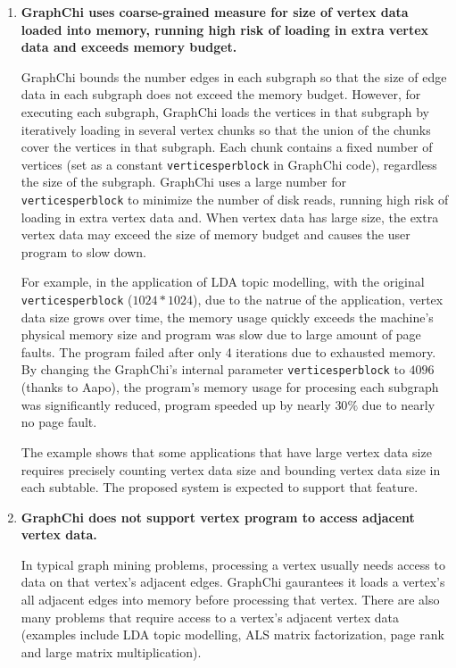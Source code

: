 \documentclass[10pt, twocolumn, a4paper]{article}
\begin{document}
\begin{enumerate}
  
\item \textbf{GraphChi uses coarse-grained measure for size of vertex data loaded into memory, running high risk of loading in extra vertex data and exceeds memory budget.}

GraphChi bounds the number edges in each subgraph so that the size of edge data in each subgraph does not exceed the memory budget. However, for executing each subgraph, GraphChi loads the vertices in that subgraph by iteratively loading in several vertex chunks so that the union of the chunks cover the vertices in that subgraph. Each chunk contains a fixed number of vertices (set as a constant \texttt{verticesperblock} in GraphChi code), regardless the size of the subgraph. GraphChi uses a large number for \texttt{verticesperblock} to minimize the number of disk reads, running high risk of loading in extra vertex data and. When vertex data has large size, the extra vertex data may exceed the size of memory budget and causes the user program to slow down.

For example, in the application of LDA topic modelling, with the original \texttt{verticesperblock} ($1024*1024$), due to the natrue of the application, vertex data size grows over time, the memory usage quickly exceeds the machine's physical memory size and program was slow due to large amount of page faults. The program failed after only 4 iterations due to exhausted memory. By changing the GraphChi's internal parameter \texttt{verticesperblock} to $4096$ (thanks to Aapo), the program's memory usage for procesing each subgraph was significantly reduced, program speeded up by nearly $30\%$ due to nearly no page fault.

The example shows that some applications that have large vertex data size requires precisely counting vertex data size and bounding vertex data size in each subtable. The proposed system is expected to support that feature.

\item \textbf{GraphChi does not support vertex program to access adjacent vertex data.}

In typical graph mining problems, processing a vertex usually needs access to data on that vertex's adjacent edges. GraphChi gaurantees it loads a vertex's all adjacent edges into memory before processing that vertex. There are also many problems that require access to a vertex's adjacent vertex data (examples include LDA topic modelling, ALS matrix factorization, page rank and large matrix multiplication). 


\end{enumerate}
\end{document}
